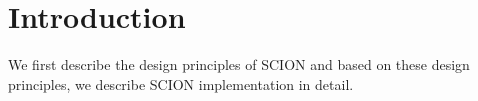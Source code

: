 \section{Introduction}
We first describe the design principles of SCION and 
based on these design principles, we describe SCION implementation in detail.
